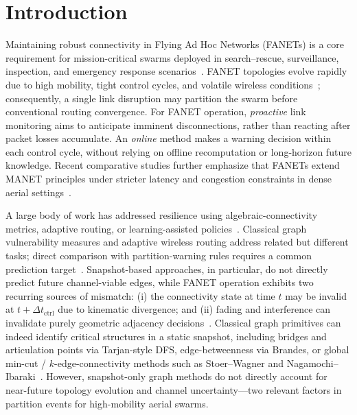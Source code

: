 \documentclass[preprint,12pt]{elsarticle}
\theoremstyle{definition}\newtheorem{definition}{Definition}
\theoremstyle{plain}\newtheorem{theorem}{Theorem}
\theoremstyle{plain}\newtheorem{lemma}{Lemma}
\theoremstyle{plain}\newtheorem{corollary}{Corollary}
\theoremstyle{plain}\newtheorem{assumption}{Assumption}
\theoremstyle{remark}\newtheorem{remark}[theorem]{Remark}
\begin{document}
\section{Introduction}
Maintaining robust connectivity in Flying Ad Hoc Networks (FANETs) is a core requirement for mission-critical swarms deployed in search--rescue, surveillance, inspection, and emergency response scenarios~\cite{ranga2013network,rukaiya2024sdr}. FANET topologies evolve rapidly due to high mobility, tight control cycles, and volatile wireless conditions~\cite{yang2024pica}; consequently, a single link disruption may partition the swarm before conventional routing convergence. For FANET operation, \emph{proactive} link monitoring aims to anticipate imminent disconnections, rather than reacting after packet losses accumulate. An \emph{online} method makes a warning decision within each control cycle, without relying on offline recomputation or long-horizon future knowledge. Recent comparative studies further emphasize that FANETs extend MANET principles under stricter latency and congestion constraints in dense aerial settings~\cite{romero2025FANET,garciagil2024latency}.

A large body of work has addressed resilience using algebraic-connectivity metrics, adaptive routing, or learning-assisted policies~\cite{alenazi2023system,bai2024adaptive,bouziane2025routing,tho2025gpsrcb}. Classical graph vulnerability measures and adaptive wireless routing address related but different tasks; direct comparison with partition-warning rules requires a common prediction target~\cite{tarjan1972dfs,brandes2001betweenness,bai2024adaptive}. Snapshot-based approaches, in particular, do not directly predict future channel-viable edges, while FANET operation exhibits two recurring sources of mismatch: (i) the connectivity state at time $t$ may be invalid at $t+\Delta t_{\text{ctrl}}$ due to kinematic divergence; and (ii) fading and interference can invalidate purely geometric adjacency decisions~\cite{gashaw2025urban}. Classical graph primitives can indeed identify critical structures in a static snapshot, including bridges and articulation points via Tarjan-style DFS, edge-betweenness via Brandes, or global min-cut / $k$-edge-connectivity
methods such as Stoer--Wagner and Nagamochi--Ibaraki~\cite{tarjan1972dfs,brandes2001betweenness,stoer1997mincut,nagamochi1992edgeconn}. However, snapshot-only graph methods do not directly account for near-future topology evolution and channel uncertainty---two relevant factors in partition events for high-mobility aerial swarms.
\end{document}
